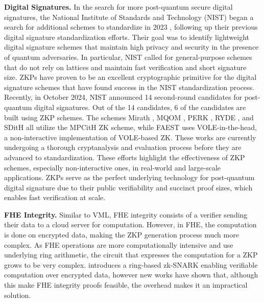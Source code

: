 \textbf{Digital Signatures. }
In the search for more post-quantum secure digital signatures, the National Institute of Standards and Technology (NIST) began a search for additional schemes to standardize in 2023 \cite{NIST_PQC_Round2_Signatures}, following up their previous digital signature standardization efforts. Their goal was to identify lightweight digital signature schemes that maintain high privacy and security in the presence of quantum adversaries. In particular, NIST called for general-purpose schemes that do not rely on lattices and maintain fast verification and short signature size. ZKPs have proven to be an excellent cryptographic primitive for the digital signature schemes that have found success in the NIST standardization process. Recently, in October 2024, NIST announced 14 second-round candidates for post-quantum digital signatures. Out of the 14 candidates, 6 of the candidates are built using ZKP schemes. The schemes Mirath \cite{PQC_MIRATH_Website}, MQOM \cite{benadjila2024mq}, PERK \cite{bettaieb2024perk}, RYDE \cite{aragon2023ryde}, and SDitH \cite{SDITH_Website} all utilize the MPCitH ZK scheme, while FAEST \cite{baum2023publicly} uses VOLE-in-the-head, a non-interactive implementation of VOLE-based ZK. These works are currently undergoing a thorough cryptanalysis and evaluation process before they are advanced to standardization. These efforts highlight the effectiveness of ZKP schemes, especially non-interactive ones, in real-world and large-scale applications. ZKPs serve as the perfect underlying technology for post-quantum digital signature due to their public verifiability and succinct proof sizes, which enables fast verification at scale.

\textbf{FHE Integrity. }
Similar to VML, FHE integrity consists of a verifier sending their data to a cloud server for computation. However, in FHE, the computation is done on encrypted data, making the ZKP generation process much more complex. As FHE operations are more computationally intensive and use underlying ring arithmetic, the circuit that expresses the computation for a ZKP grows to be very complex. \cite{ganesh2023rinocchio} introduces a ring-based zk-SNARK enabling verifiable computation over encrypted data, however new works \cite{viand2023verifiable} have shown that, although this make FHE integrity proofs feasible, the overhead makes it an impractical solution. 

